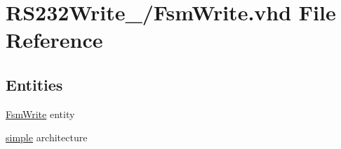 \hypertarget{16_2_fsm_write_8vhd}{}\section{R\+S232\+Write\+\_/\+Fsm\+Write.vhd File Reference}
\label{16_2_fsm_write_8vhd}
\subsection*{Entities}
\begin{DoxyCompactItemize}
\item 
\hyperlink{class_fsm_write}{Fsm\+Write} entity
\item 
\hyperlink{class_fsm_write_1_1simple}{simple} architecture
\end{DoxyCompactItemize}

